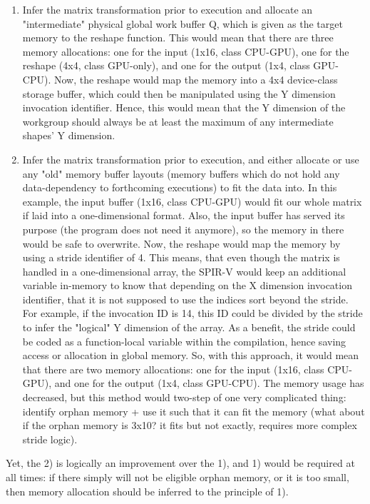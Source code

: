 \documentclass{IEEEtran}
\begin{document}
\begin{enumerate}

\item Infer the matrix transformation prior to execution and allocate an "intermediate" physical global work buffer Q, which is given as the target memory to the reshape function. This would mean that there are three memory allocations: one for the input (1x16, class CPU-GPU), one for the reshape (4x4, class GPU-only), and one for the output (1x4, class GPU-CPU). Now, the reshape would map the memory into a 4x4 device-class storage buffer, which could then be manipulated using the Y dimension invocation identifier. Hence, this would mean that the Y dimension of the workgroup should always be at least the maximum of any intermediate shapes' Y dimension.

\item Infer the matrix transformation prior to execution, and either allocate or use any "old" memory buffer layouts (memory buffers which do not hold any data-dependency to forthcoming executions) to fit the data into. In this example, the input buffer (1x16, class CPU-GPU) would fit our whole matrix if laid into a one-dimensional format. Also, the input buffer has served its purpose (the program does not need it anymore), so the memory in there would be safe to overwrite. Now, the reshape would map the memory by using a stride identifier of 4. This means, that even though the matrix is handled in a one-dimensional array, the SPIR-V would keep an additional variable in-memory to know that depending on the X dimension invocation identifier, that it is not supposed to use the indices sort beyond the stride. For example, if the invocation ID is 14, this ID could be divided by the stride to infer the "logical" Y dimension of the array. As a benefit, the stride could be coded as a function-local variable within the compilation, hence saving access or allocation in global memory. So, with this approach, it would mean that there are two memory allocations: one for the input (1x16, class CPU-GPU), and one for the output (1x4, class GPU-CPU). The memory usage has decreased, but this method would two-step of one very complicated thing: identify orphan memory + use it such that it can fit the memory (what about if the orphan memory is 3x10? it fits but not exactly, requires more complex stride logic).

\end{enumerate}

Yet, the 2) is logically an improvement over the 1), and 1) would be required at all times: if there simply will not be eligible orphan memory, or it is too small, then memory allocation should be inferred to the principle of 1).
\end{document}
